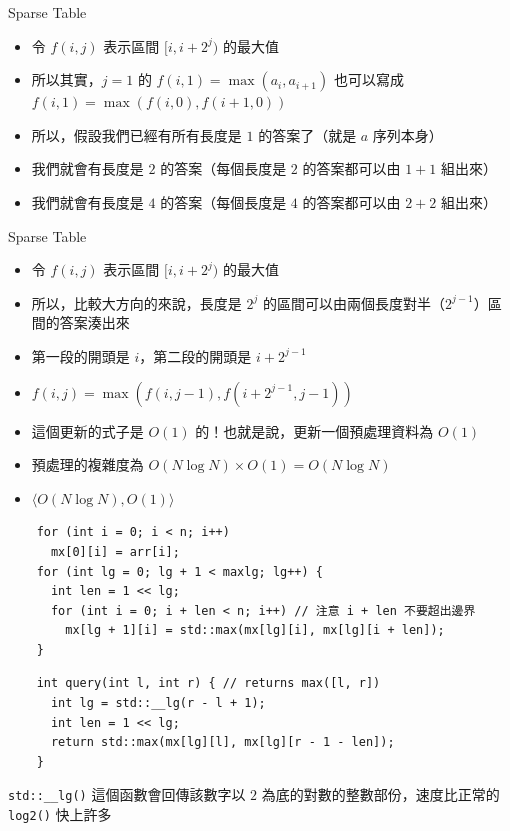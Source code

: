 \documentclass[standalone]{beamer}
\begin{document}
\begin{frame}[fragile]{Sparse Table}
  \begin{itemize}
    \item 令 \(f(i, j)\) 表示區間 \([i, i+2^j)\) 的最大值
    \item 所以其實，$j = 1$ 的 $f(i, 1) = \max(a_i, a_{i + 1})$ 也可以寫成 $f(i, 1) = \max(f(i, 0), f(i + 1, 0))$
    \item 所以，假設我們已經有所有長度是 $1$ 的答案了（就是 $a$ 序列本身）
    \item 我們就會有長度是 $2$ 的答案（每個長度是 $2$ 的答案都可以由 $1 + 1$ 組出來）
    \item 我們就會有長度是 $4$ 的答案（每個長度是 $4$ 的答案都可以由 $2 + 2$ 組出來）
  \end{itemize}
\end{frame}

\begin{frame}{Sparse Table}
  \begin{itemize}
    \item 令 \(f(i, j)\) 表示區間 \([i, i+2^j)\) 的最大值
    \item 所以，比較大方向的來說，長度是 $2^j$ 的區間可以由兩個長度對半（$2^{j - 1}$）區間的答案湊出來
    \item 第一段的開頭是 $i$，第二段的開頭是 $i + 2^{j - 1}$
    \item $f(i, j) = \max(f(i, j - 1), f(i + 2^{j - 1}, j - 1))$
    \item 這個更新的式子是 $O(1)$ 的！也就是說，更新一個預處理資料為 $O(1)$
    \item 預處理的複雜度為 $O(N \log N) \times O(1) = O(N \log N)$
    \item \(\langle {O}(N \log N), {O}(1)\rangle\)
  \end{itemize}
\end{frame}

\begin{frame}[fragile]{}
  \begin{verbatim}
    for (int i = 0; i < n; i++)
      mx[0][i] = arr[i];
    for (int lg = 0; lg + 1 < maxlg; lg++) {
      int len = 1 << lg;
      for (int i = 0; i + len < n; i++) // 注意 i + len 不要超出邊界
        mx[lg + 1][i] = std::max(mx[lg][i], mx[lg][i + len]);
    }
  \end{verbatim}
\end{frame}

\begin{frame}[fragile]{}
  \begin{verbatim}
    int query(int l, int r) { // returns max([l, r])
      int lg = std::__lg(r - l + 1);
      int len = 1 << lg;
      return std::max(mx[lg][l], mx[lg][r - 1 - len]);
    }
  \end{verbatim}

  \texttt{std::\_\_lg()} 這個函數會回傳該數字以 $2$ 為底的對數的整數部份，速度比正常的 \texttt{log2()} 快上許多
\end{frame}
\end{document}
